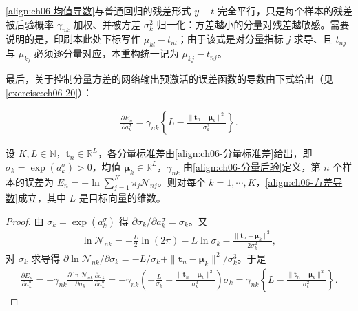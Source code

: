 \documentclass[../../main.tex]{subfiles}
\begin{document}
\begin{remark}\eqref{align:ch06-均值导数}与普通回归的残差形式 $y-t$ 完全平行，只是每个样本的残差被后验概率 $\gamma_{nk}$ 加权、并被方差 $\sigma_k^{2}$ 归一化：方差越小的分量对残差越敏感。需要说明的是，印刷本此处下标写作 $\mu_{kl}-t_{nl}$；由于该式是对分量指标 $j$ 求导、且 $t_{nj}$ 与 $\mu_{kj}$ 必须逐分量对应，本重构统一记为 $\mu_{kj}-t_{nj}$。
\end{remark}

最后，关于控制分量方差的网络输出预激活的误差函数的导数由下式给出（见\cref{exercise:ch06-20}）：

\begin{align}
\frac{\partial E_n}{\partial a_k^{\sigma}}=\gamma_{nk}\left\{L-\frac{\|\boldsymbol{t}_n-\boldsymbol{\mu}_k\|^{2}}{\sigma_k^{2}}\right\}.
\label{align:ch06-方差导数}
\end{align}

\begin{proposition}[分量方差预激活的导数]\label{proposition:ch06-方差导数}
设 $K,L\in\mathbb{N}$，$\boldsymbol{t}_{n}\in\mathbb{R}^{L}$，各分量标准差由\eqref{align:ch06-分量标准差}给出，即 $\sigma_{k}=\exp(a_{k}^{\sigma})>0$，均值 $\boldsymbol{\mu}_{k}\in\mathbb{R}^{L}$，$\gamma_{nk}$ 由\eqref{align:ch06-分量后验}定义，第 $n$ 个样本的误差为 $E_{n}=-\ln\sum_{j=1}^{K}\pi_{j}\mathcal{N}_{nj}$。则对每个 $k=1,\cdots,K$，\eqref{align:ch06-方差导数}成立，其中 $L$ 是目标向量的维数。
\end{proposition}

\begin{proof}
由 $\sigma_k=\exp(a_k^{\sigma})$ 得 $\partial\sigma_k/\partial a_k^{\sigma}=\sigma_k$。又
\begin{align}
\ln\mathcal{N}_{nk}=-\frac{L}{2}\ln(2\pi)-L\ln\sigma_k-\frac{\|\boldsymbol{t}_n-\boldsymbol{\mu}_k\|^{2}}{2\sigma_k^{2}},
\end{align}
对 $\sigma_k$ 求导得 $\partial\ln\mathcal{N}_{nk}/\partial\sigma_k=-L/\sigma_k+\|\boldsymbol{t}_n-\boldsymbol{\mu}_k\|^{2}/\sigma_k^{3}$。于是
\begin{align}
\frac{\partial E_n}{\partial a_k^{\sigma}}
=-\gamma_{nk}\frac{\partial\ln\mathcal{N}_{nk}}{\partial\sigma_k}\frac{\partial\sigma_k}{\partial a_k^{\sigma}}
=-\gamma_{nk}\left(-\frac{L}{\sigma_k}+\frac{\|\boldsymbol{t}_n-\boldsymbol{\mu}_k\|^{2}}{\sigma_k^{3}}\right)\sigma_k
=\gamma_{nk}\left\{L-\frac{\|\boldsymbol{t}_n-\boldsymbol{\mu}_k\|^{2}}{\sigma_k^{2}}\right\}.
\end{align}
\end{proof}
\end{document}
